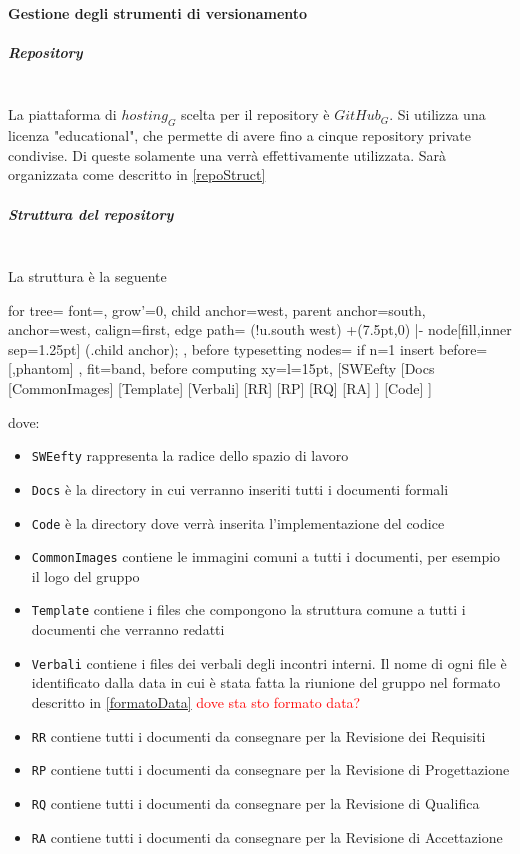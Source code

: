 		\paragraph{Gestione degli strumenti di versionamento}
			\subparagraph{Repository}\mbox{} \\
			La piattaforma di $hosting_G$ scelta per il repository è $GitHub_G$. Si utilizza una licenza "educational", che permette di avere fino a cinque repository private condivise. Di queste solamente una verrà effettivamente utilizzata. Sarà organizzata come descritto in \ref{repoStruct}
			\subparagraph{Struttura del repository}\mbox{} \\
			\label{repoStruct}
			La struttura è la seguente\\
			\begin{center}
			\begin{forest}
				for tree={
					font=\ttfamily,
					grow'=0,
					child anchor=west,
					parent anchor=south,
					anchor=west,
					calign=first,
					edge path={
						\noexpand{}
						(!u.south west) +(7.5pt,0) |- node[fill,inner sep=1.25pt] {} (.child anchor);
					},
					before typesetting nodes={
						if n=1
						{insert before={[,phantom]}}
						{}
					},
					fit=band,
					before computing xy={l=15pt},
				}
				[SWEefty
					[Docs
						[CommonImages]
						[Template]
						[Verbali]
						[RR]
						[RP]
						[RQ]
						[RA]
					]
					[Code]
				]
			\end{forest}
			\end{center}
			dove:
			\begin{itemize}
				\item \texttt{SWEefty} rappresenta la radice dello spazio di lavoro
				\item \texttt{Docs} è la directory in cui verranno inseriti tutti i documenti formali
				\item \texttt{Code} è la directory dove verrà inserita l'implementazione del codice
				\item \texttt{CommonImages} contiene le immagini comuni a tutti i documenti, per esempio il logo del gruppo
				\item \texttt{Template} contiene i files che compongono la struttura comune a tutti i documenti che verranno redatti
				\item \texttt{Verbali} contiene i files dei verbali degli incontri interni. Il nome di ogni file è identificato dalla data in cui è stata fatta la riunione del gruppo nel formato descritto in \ref{formatoData} \textcolor{red}{dove sta sto formato data?}
				\item \texttt{RR} contiene tutti i documenti da consegnare per la Revisione dei Requisiti
				\item \texttt{RP} contiene tutti i documenti da consegnare per la Revisione di Progettazione
				\item \texttt{RQ} contiene tutti i documenti da consegnare per la Revisione di Qualifica
				\item \texttt{RA} contiene tutti i documenti da consegnare per la Revisione di Accettazione
				  				
			\end{itemize}
			
